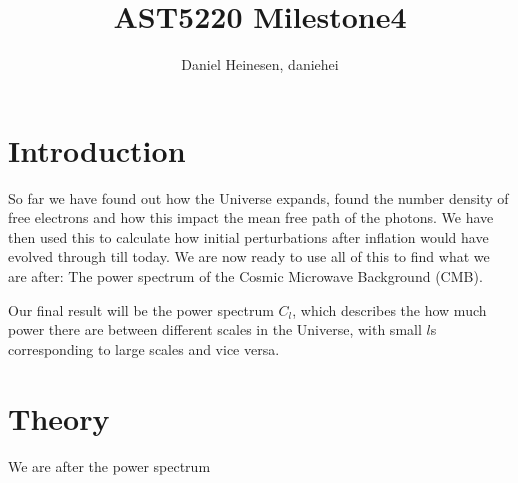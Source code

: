\documentclass[a4paper,norsk, 10pt]{article}
\title{AST5220 Milestone4}
\author{Daniel Heinesen, daniehei}
\begin{document}
\maketitle
\section{Introduction}
So far we have found out how the Universe expands, found the number density of free electrons and how this impact the mean free path of the photons. We have then used this to calculate how initial perturbations after inflation would have evolved through till today. We are now ready to use all of this to find what we are after: The power spectrum of the Cosmic Microwave Background (CMB). 

Our final result will be the power spectrum $C_l$, which describes the how much power there are between different scales in the Universe, with small $l$s corresponding to large scales and vice versa.

\section{Theory}
We are after the power spectrum
\end{document}
